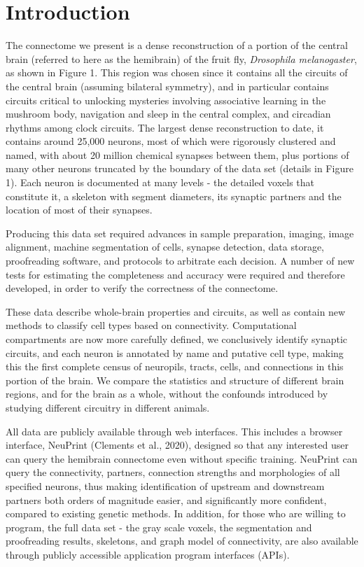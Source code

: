 \documentclass{article}
\begin{document}
\section*{Introduction}

The connectome we present is a dense reconstruction of a portion of the central brain (referred to here as the hemibrain) of the fruit fly, \emph{Drosophila melanogaster}, as shown in Figure 1. This region was chosen since it contains all the circuits of the central brain (assuming bilateral symmetry), and in particular contains circuits critical to unlocking mysteries involving associative learning in the mushroom body, navigation and sleep in the central complex, and circadian rhythms among clock circuits. The largest dense reconstruction to date, it contains around 25,000 neurons, most of which were rigorously clustered and named, with about 20 million chemical synapses between them, plus portions of many other neurons truncated by the boundary of the data set (details in Figure 1). Each neuron is documented at many levels - the detailed voxels that constitute it, a skeleton with segment diameters, its synaptic partners and the location of most of their synapses.

Producing this data set required advances in sample preparation, imaging, image alignment, machine segmentation of cells, synapse detection, data storage, proofreading software, and protocols to arbitrate each decision. A number of new tests for estimating the completeness and accuracy were required and therefore developed, in order to verify the correctness of the connectome.

These data describe whole-brain properties and circuits, as well as contain new methods to classify cell types based on connectivity. Computational compartments are now more carefully defined, we conclusively identify synaptic circuits, and each neuron is annotated by name and putative cell type, making this the first complete census of neuropils, tracts, cells, and connections in this portion of the brain. We compare the statistics and structure of different brain regions, and for the brain as a whole, without the confounds introduced by studying different circuitry in different animals.


All data are publicly available through web interfaces. This includes a browser interface, NeuPrint (Clements et al., 2020), designed so that any interested user can query the hemibrain connectome even without specific training. NeuPrint can query the connectivity, partners, connection strengths and morphologies of all specified neurons, thus making identification of upstream and downstream partners both orders of magnitude easier, and significantly more confident, compared to existing genetic methods. In addition, for those who are willing to program, the full data set - the gray scale voxels, the segmentation and proofreading results, skeletons, and graph model of connectivity, are also available through publicly accessible application program interfaces (APIs).
\end{document}
